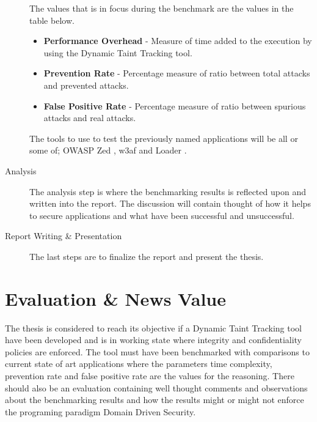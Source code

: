 \documentclass{../kththesis}
\begin{document}
\begin{description}
		The values that is in focus during the benchmark are the values in the table below. 
		
		\begin{itemize}  
			\item \textbf{Performance Overhead} - Measure of time added to the execution by using the Dynamic Taint Tracking tool.
			\item \textbf{Prevention Rate} - Percentage measure of ratio between total attacks and prevented attacks.
			\item \textbf{False Positive Rate} - Percentage measure of ratio between spurious attacks and real attacks.
		\end{itemize}
	
		The tools to use to test the previously named applications will be all or some of; OWASP Zed \parencite{zed}, w3af \parencite{w3af} and Loader \parencite{loader}.
	
		\item [Analysis]
		The analysis step is where the benchmarking results is reflected upon and written into the report. The discussion will contain thought of how it helps to secure applications and what have been successful and unsuccessful.
	
		\item [Report Writing \& Presentation]
		The last steps are to finalize the report and present the thesis.
	\end{description}
	
	
	
	\chapter{Evaluation \& News Value}
	The thesis is considered to reach its objective if a Dynamic Taint Tracking tool have been developed and is in working state where integrity and confidentiality policies are enforced. The tool must have been benchmarked with comparisons to current state of art applications where the parameters time complexity, prevention rate and false positive rate are the values for the reasoning. There should also be an evaluation containing well thought comments and observations about the benchmarking results and how the results might or might not enforce the programing paradigm Domain Driven Security.
	
\end{document}
